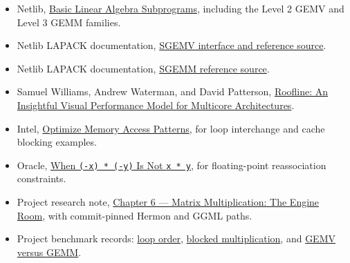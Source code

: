 \begin{itemize}
\tightlist
\item
  Netlib, \href{https://www.netlib.org/blas/}{Basic Linear Algebra
  Subprograms}, including the Level 2 GEMV and Level 3 GEMM families.
\item
Netlib LAPACK documentation,
  \href{https://netlib.org/lapack/explore-html/d7/dda/group__gemv_ga0d35d880b663ad18204bb23bd186e380.html}{SGEMV
  interface and reference source}.
\item
Netlib LAPACK documentation,
  \href{https://www.netlib.org/lapack/explore-html/d4/de2/sgemm_8f_source.html}{SGEMM
  reference source}.
\item
  Samuel Williams, Andrew Waterman, and David Patterson,
  \href{https://www2.eecs.berkeley.edu/Pubs/TechRpts/2008/EECS-2008-134.pdf}{Roofline:
  An Insightful Visual Performance Model for Multicore Architectures}.
\item
  Intel,
  \href{https://www.intel.com/content/www/us/en/docs/advisor/cookbook/2023-0/optimize-memory-access-patterns.html}{Optimize
  Memory Access Patterns}, for loop interchange and cache blocking
  examples.
\item
  Oracle,
  \href{https://docs.oracle.com/cd/E37069_01/html/E39019/gnabm.html}{When
  \texttt{(-x)\ *\ (-y)} Is Not \texttt{x\ *\ y}}, for floating-point
  reassociation constraints.
\item
  Project research note,
  \href{https://github.com/hermonai/inside-the-llm-engine/blob/astra-visual-rewrite/research/part-02/chapter-06-matrix-multiplication-the-engine-room.md}{Chapter
  6 --- Matrix Multiplication: The Engine Room}, with commit-pinned
  Hermon and GGML paths.
\item
  Project benchmark records:
  \href{https://github.com/hermonai/inside-the-llm-engine/blob/astra-visual-rewrite/research/benchmarks/chapter-06-loop-order.md}{loop
  order},
  \href{https://github.com/hermonai/inside-the-llm-engine/blob/astra-visual-rewrite/research/benchmarks/chapter-06-blocked-matmul.md}{blocked
  multiplication}, and
  \href{https://github.com/hermonai/inside-the-llm-engine/blob/astra-visual-rewrite/research/benchmarks/chapter-06-gemv-vs-gemm.md}{GEMV
  versus GEMM}.
\end{itemize}



